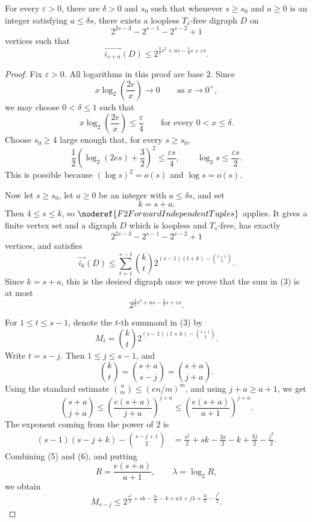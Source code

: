 \begin{lemma}
For every \(\varepsilon>0\), there are \(\delta>0\) and \(s_0\) such that whenever \(s\ge s_0\) and \(a\ge 0\) is an integer satisfying \(a\le \delta s\), there exists a loopless \(T_s\)-free digraph \(D\) on
\[
  2^{2s-3}-2^{s-1}-2^{s-2}+1
\]
vertices such that
\[
  \overrightarrow{i_{s+a}}(D)\le
  2^{\frac32s^2+as-\frac52s+\varepsilon s}.
\]
\end{lemma}
\begin{proof}
Fix \(\varepsilon>0\). All logarithms in this proof are base \(2\). Since
\[
  x\log_2\left(\frac{2e}{x}\right)\to0
  \qquad\text{as }x\to0^+,
\]
we may choose \(0<\delta\le1\) such that
\[
  x\log_2\left(\frac{2e}{x}\right)\le \frac{\varepsilon}{4}
  \qquad\text{for every }0<x\le\delta. \tag{1}
\]
Choose \(s_0\ge4\) large enough that, for every \(s\ge s_0\),
\[
  \frac12\left(\log_2(2es)+\frac32\right)^2\le \frac{\varepsilon s}{4},
  \qquad
  \log_2 s\le\frac{\varepsilon s}{2}. \tag{2}
\]
This is possible because \((\log s)^2=o(s)\) and \(\log s=o(s)\).

Now let \(s\ge s_0\), let \(a\ge0\) be an integer with \(a\le\delta s\), and set
\[
  k=s+a.
\]
Then \(4\le s\le k\), so \(\noderef{F2ForwardIndependentTuples}\) applies. It gives a finite vertex set and a digraph \(D\) which is loopless and \(T_s\)-free, has exactly
\[
  2^{2s-3}-2^{s-1}-2^{s-2}+1
\]
vertices, and satisfies
\[
  \overrightarrow{i_k}(D)\le
  \sum_{t=1}^{s-1}
    \binom{k}{t}2^{(s-1)(t+k)-\binom{t+1}{2}}. \tag{3}
\]
Since \(k=s+a\), this is the desired digraph once we prove that the sum in (3) is at most
\[
  2^{\frac32s^2+as-\frac52s+\varepsilon s}. \tag{4}
\]

For \(1\le t\le s-1\), denote the \(t\)-th summand in (3) by
\[
  M_t=\binom{k}{t}2^{(s-1)(t+k)-\binom{t+1}{2}}.
\]
Write \(t=s-j\). Then \(1\le j\le s-1\), and
\[
  \binom{k}{t}
  =\binom{s+a}{s-j}
  =\binom{s+a}{j+a}.
\]
Using the standard estimate \(\binom{n}{m}\le (en/m)^m\), and using \(j+a\ge a+1\), we get
\[
  \binom{s+a}{j+a}
  \le
  \left(\frac{e(s+a)}{j+a}\right)^{j+a}
  \le
  \left(\frac{e(s+a)}{a+1}\right)^{j+a}. \tag{5}
\]
The exponent coming from the power of \(2\) is
\[
\begin{aligned}
  (s-1)(s-j+k)-\binom{s-j+1}{2}
  &=
  \frac{s^2}{2}+sk-\frac{3s}{2}-k+\frac{3j}{2}-\frac{j^2}{2}.
\end{aligned} \tag{6}
\]
Combining (5) and (6), and putting
\[
  R=\frac{e(s+a)}{a+1},\qquad \lambda=\log_2 R,
\]
we obtain
\[
  M_{s-j}
  \le
  2^{
    \frac{s^2}{2}+sk-\frac{3s}{2}-k
    +a\lambda+j\lambda+\frac{3j}{2}-\frac{j^2}{2}
  }. \tag{7}
\]


\end{proof}
